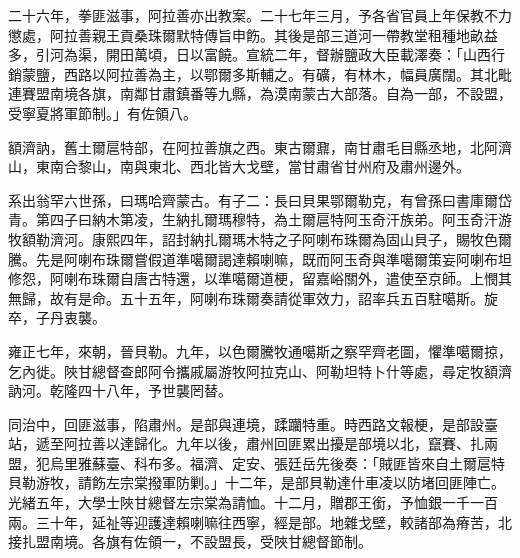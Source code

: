 \begin{pinyinscope}
二十六年，拳匪滋事，阿拉善亦出教案。二十七年三月，予各省官員上年保教不力懲處，阿拉善親王貢桑珠爾默特傳旨申飭。其後是部三道河一帶教堂租種地畝益多，引河為渠，開田萬頃，日以富饒。宣統二年，督辦鹽政大臣載澤奏：「山西行銷蒙鹽，西路以阿拉善為主，以鄂爾多斯輔之。有礦，有林木，幅員廣闊。其北毗連賽盟南境各旗，南鄰甘肅鎮番等九縣，為漠南蒙古大部落。自為一部，不設盟，受寧夏將軍節制。」有佐領八。

額濟訥，舊土爾扈特部，在阿拉善旗之西。東古爾鼐，南甘肅毛目縣丞地，北阿濟山，東南合黎山，南與東北、西北皆大戈壁，當甘肅省甘州府及肅州邊外。

系出翁罕六世孫，曰瑪哈齊蒙古。有子二：長曰貝果鄂爾勒克，有曾孫曰書庫爾岱青。第四子曰納木第凌，生納扎爾瑪穆特，為土爾扈特阿玉奇汗族弟。阿玉奇汗游牧額勒濟河。康熙四年，詔封納扎爾瑪木特之子阿喇布珠爾為固山貝子，賜牧色爾騰。先是阿喇布珠爾嘗假道準噶爾謁達賴喇嘛，既而阿玉奇與準噶爾策妄阿喇布坦修怨，阿喇布珠爾自唐古特還，以準噶爾道梗，留嘉峪關外，遣使至京師。上憫其無歸，故有是命。五十五年，阿喇布珠爾奏請從軍效力，詔率兵五百駐噶斯。旋卒，子丹衷襲。

雍正七年，來朝，晉貝勒。九年，以色爾騰牧通噶斯之察罕齊老圖，懼準噶爾掠，乞內徙。陜甘總督查郎阿令攜戚屬游牧阿拉克山、阿勒坦特卜什等處，尋定牧額濟訥河。乾隆四十八年，予世襲罔替。

同治中，回匪滋事，陷肅州。是部與連境，蹂躪特重。時西路文報梗，是部設臺站，遞至阿拉善以達歸化。九年以後，肅州回匪累出擾是部境以北，竄賽、扎兩盟，犯烏里雅蘇臺、科布多。福濟、定安、張廷岳先後奏：「賊匪皆來自土爾扈特貝勒游牧，請飭左宗棠撥軍防剿。」十二年，是部貝勒達什車凌以防堵回匪陣亡。光緒五年，大學士陜甘總督左宗棠為請恤。十二月，贈郡王銜，予恤銀一千一百兩。三十年，延祉等迎護達賴喇嘛往西寧，經是部。地雜戈壁，較諸部為瘠苦，北接扎盟南境。各旗有佐領一，不設盟長，受陜甘總督節制。


\end{pinyinscope}